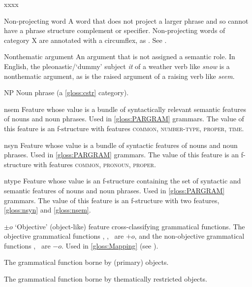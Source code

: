 \documentclass[output=paper,colorlinks,citecolor=brown]{langscibook}
\begin{document}
\begin{labeling}{xxxx}
\item[Non-projecting word\namedlabel{gloss:Nonproj}{Non-projecting word}] A word that does not project a larger phrase and so cannot have a phrase structure complement or specifier.  Non-projecting words of category X are annotated with a circumflex, as .  See \citetv[\ref{sect:xbar}]{chapters/CoreConcepts}.

\item[Nonthematic argument\namedlabel{gloss:nonthematicarguments}{nonthematic arguments}] An argument that is not assigned a semantic role.  In English, the pleonastic/`dummy' subject \emph{it} of a weather verb like \emph{snow} is a nonthematic argument, as is the raised argument of a raising verb like \emph{seem}.

\item[NP\namedlabel{gloss:NP}{NP}] Noun phrase (a \ref{gloss:cstr} category).

\item[nsem\namedlabel{gloss:nsem}{\textsc{nsem}}] Feature whose value is a bundle of syntactically relevant semantic features of nouns and noun phrases.  Used in \ref{gloss:PARGRAM} grammars.  The value of this feature is an f-structure with features \textsc{common, number-type, proper, time}.

\item[nsyn\namedlabel{gloss:nsyn}{\textsc{nsyn}}] Feature whose value is a bundle of syntactic features of nouns and noun phrases.  Used in \ref{gloss:PARGRAM} grammars.  The value of this feature is an f-structure with features \textsc{common, pronoun, proper}.

\item[ntype] Feature whose value is an f-structure containing the set of syntactic and semantic features of nouns and noun phrases.  Used in \ref{gloss:PARGRAM} grammars. The value of this feature is an f-structure with two features, \ref{gloss:nsyn} and \ref{gloss:nsem}.

\item[{${\pm}o$}] `Objective' (object-like) feature cross-classifying grammatical functions.  The objective grammatical functions \OBJ, , \OBJTHETA\ are $+o$, and the non-objective grammatical functions \SUBJ, \OBLTHETA\ are $-o$.  Used in \ref{gloss:Mapping} (see ).

\item[\OBJ\namedlabel{gloss:obj}{\OBJ}] The grammatical function borne by (primary) objects.

\item[\OBJTHETA\namedlabel{gloss:objtheta}{\OBJTHETA}] The grammatical function borne by thematically restricted objects.


\end{labeling}
\end{document}
